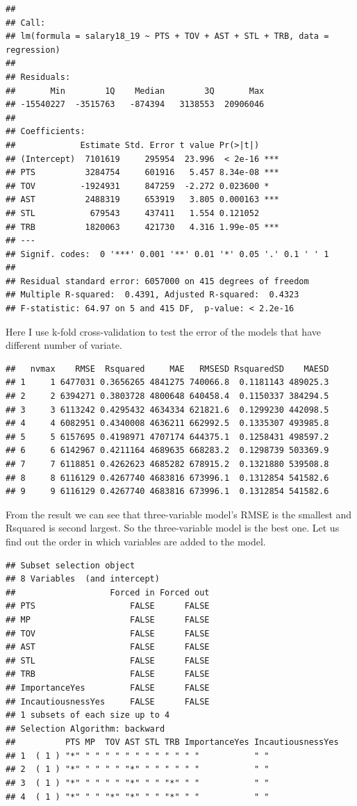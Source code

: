 \documentclass[]{article}
\begin{document}
\begin{verbatim}
## 
## Call:
## lm(formula = salary18_19 ~ PTS + TOV + AST + STL + TRB, data = regression)
## 
## Residuals:
##       Min        1Q    Median        3Q       Max 
## -15540227  -3515763   -874394   3138553  20906046 
## 
## Coefficients:
##             Estimate Std. Error t value Pr(>|t|)    
## (Intercept)  7101619     295954  23.996  < 2e-16 ***
## PTS          3284754     601916   5.457 8.34e-08 ***
## TOV         -1924931     847259  -2.272 0.023600 *  
## AST          2488319     653919   3.805 0.000163 ***
## STL           679543     437411   1.554 0.121052    
## TRB          1820063     421730   4.316 1.99e-05 ***
## ---
## Signif. codes:  0 '***' 0.001 '**' 0.01 '*' 0.05 '.' 0.1 ' ' 1
## 
## Residual standard error: 6057000 on 415 degrees of freedom
## Multiple R-squared:  0.4391, Adjusted R-squared:  0.4323 
## F-statistic: 64.97 on 5 and 415 DF,  p-value: < 2.2e-16
\end{verbatim}

Here I use k-fold cross-validation to test the error of the models that
have different number of variate.

\begin{verbatim}
##   nvmax    RMSE  Rsquared     MAE   RMSESD RsquaredSD    MAESD
## 1     1 6477031 0.3656265 4841275 740066.8  0.1181143 489025.3
## 2     2 6394271 0.3803728 4800648 640458.4  0.1150337 384294.5
## 3     3 6113242 0.4295432 4634334 621821.6  0.1299230 442098.5
## 4     4 6082951 0.4340008 4636211 662992.5  0.1335307 493985.8
## 5     5 6157695 0.4198971 4707174 644375.1  0.1258431 498597.2
## 6     6 6142967 0.4211164 4689635 668283.2  0.1298739 503369.9
## 7     7 6118851 0.4262623 4685282 678915.2  0.1321880 539508.8
## 8     8 6116129 0.4267740 4683816 673996.1  0.1312854 541582.6
## 9     9 6116129 0.4267740 4683816 673996.1  0.1312854 541582.6
\end{verbatim}

From the result we can see that three-variable model's RMSE is the
smallest and Rsquared is second largest. So the three-variable model is
the best one. Let us find out the order in which variables are added to
the model.

\begin{verbatim}
## Subset selection object
## 8 Variables  (and intercept)
##                   Forced in Forced out
## PTS                   FALSE      FALSE
## MP                    FALSE      FALSE
## TOV                   FALSE      FALSE
## AST                   FALSE      FALSE
## STL                   FALSE      FALSE
## TRB                   FALSE      FALSE
## ImportanceYes         FALSE      FALSE
## IncautiousnessYes     FALSE      FALSE
## 1 subsets of each size up to 4
## Selection Algorithm: backward
##          PTS MP  TOV AST STL TRB ImportanceYes IncautiousnessYes
## 1  ( 1 ) "*" " " " " " " " " " " " "           " "              
## 2  ( 1 ) "*" " " " " "*" " " " " " "           " "              
## 3  ( 1 ) "*" " " " " "*" " " "*" " "           " "              
## 4  ( 1 ) "*" " " "*" "*" " " "*" " "           " "
\end{verbatim}
\end{document}

